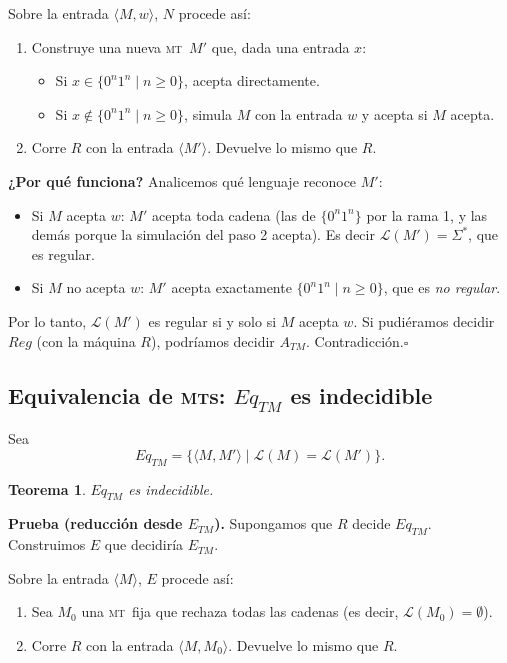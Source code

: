 \documentclass[11pt,a4paper]{article}
\theoremstyle{definicion}
\newtheorem{teorema}[definicion]{Teorema}
\newcommand{\MT}{\textsc{mt}}
\newcommand{\MTs}{\textsc{mt}s}
\newcommand{\enc}[1]{\langle #1 \rangle}
\newcommand{\Lang}{\mathcal{L}}
\begin{document}
Sobre la entrada $\enc{M, w}$, $N$ procede así:
\begin{enumerate}
    \item Construye una nueva \MT\ $M'$ que, dada una entrada $x$:
    \begin{itemize}
        \item Si $x \in \{0^n 1^n \mid n \geq 0\}$, acepta directamente.
        \item Si $x \notin \{0^n 1^n \mid n \geq 0\}$, simula $M$ con la entrada $w$ y acepta si $M$ acepta.
    \end{itemize}
    \item Corre $R$ con la entrada $\enc{M'}$. Devuelve lo mismo que $R$.
\end{enumerate}

\textbf{¿Por qué funciona?} Analicemos qué lenguaje reconoce $M'$:
\begin{itemize}
    \item Si $M$ acepta $w$: $M'$ acepta toda cadena (las de $\{0^n 1^n\}$ por la rama 1, y las demás porque la simulación del paso 2 acepta). Es decir $\Lang(M') = \Sigma^*$, que es regular.
    \item Si $M$ no acepta $w$: $M'$ acepta exactamente $\{0^n 1^n \mid n \geq 0\}$, que es \emph{no regular}.
\end{itemize}

Por lo tanto, $\Lang(M')$ es regular si y solo si $M$ acepta $w$. Si pudiéramos decidir $Reg$ (con la máquina $R$), podríamos decidir $A_{TM}$. Contradicción.\hfill$\square$

\subsection{Equivalencia de \MTs: $Eq_{TM}$ es indecidible}

Sea
\[
Eq_{TM} = \{ \enc{M, M'} \mid \Lang(M) = \Lang(M') \}.
\]

\begin{teorema}
$Eq_{TM}$ es indecidible.
\end{teorema}

\textbf{Prueba (reducción desde $E_{TM}$).} Supongamos que $R$ decide $Eq_{TM}$. Construimos $E$ que decidiría $E_{TM}$.

Sobre la entrada $\enc{M}$, $E$ procede así:
\begin{enumerate}
    \item Sea $M_0$ una \MT\ fija que rechaza todas las cadenas (es decir, $\Lang(M_0) = \emptyset$).
    \item Corre $R$ con la entrada $\enc{M, M_0}$. Devuelve lo mismo que $R$.
\end{enumerate}
\end{document}
